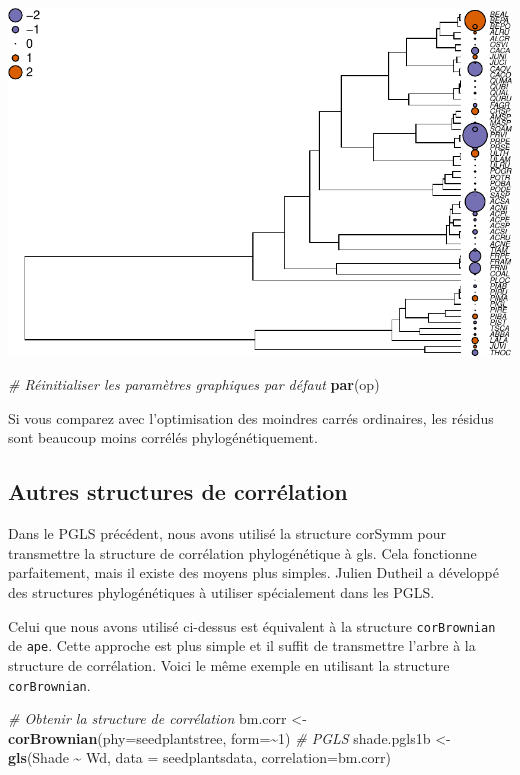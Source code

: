 \documentclass[
]{book}
\newenvironment{Shaded}{\begin{snugshade}}{\end{snugshade}}
\newcommand{\AttributeTok}[1]{\textcolor[rgb]{0.13,0.29,0.53}{#1}}
\newcommand{\CommentTok}[1]{\textcolor[rgb]{0.56,0.35,0.01}{\textit{#1}}}
\newcommand{\DecValTok}[1]{\textcolor[rgb]{0.00,0.00,0.81}{#1}}
\newcommand{\FunctionTok}[1]{\textcolor[rgb]{0.13,0.29,0.53}{\textbf{#1}}}
\newcommand{\NormalTok}[1]{#1}
\newcommand{\OtherTok}[1]{\textcolor[rgb]{0.56,0.35,0.01}{#1}}
\newcommand{\SpecialCharTok}[1]{\textcolor[rgb]{0.81,0.36,0.00}{\textbf{#1}}}
\begin{document}
\includegraphics{pcm-workshop_files/figure-latex/pgls residual fit-1.pdf}

\begin{Shaded}
\begin{Highlighting}[]
\CommentTok{\# Réinitialiser les paramètres graphiques par défaut}
\FunctionTok{par}\NormalTok{(op)}
\end{Highlighting}
\end{Shaded}

Si vous comparez avec l'optimisation des moindres carrés ordinaires, les résidus sont beaucoup moins corrélés phylogénétiquement.

\subsection{Autres structures de corrélation}\label{autres-structures-de-corruxe9lation}

Dans le PGLS précédent, nous avons utilisé la structure corSymm pour transmettre la structure de corrélation phylogénétique à gls. Cela fonctionne parfaitement, mais il existe des moyens plus simples. Julien Dutheil a développé des structures phylogénétiques à utiliser spécialement dans les PGLS.

Celui que nous avons utilisé ci-dessus est équivalent à la structure \texttt{corBrownian} de \texttt{ape}. Cette approche est plus simple et il suffit de transmettre l'arbre à la structure de corrélation. Voici le même exemple en utilisant la structure \texttt{corBrownian}.

\begin{Shaded}
\begin{Highlighting}[]
\CommentTok{\# Obtenir la structure de corrélation}
\NormalTok{bm.corr }\OtherTok{\textless{}{-}} \FunctionTok{corBrownian}\NormalTok{(}\AttributeTok{phy=}\NormalTok{seedplantstree, }\AttributeTok{form=}\SpecialCharTok{\textasciitilde{}}\DecValTok{1}\NormalTok{)}
\CommentTok{\# PGLS}
\NormalTok{shade.pgls1b }\OtherTok{\textless{}{-}} \FunctionTok{gls}\NormalTok{(Shade }\SpecialCharTok{\textasciitilde{}}\NormalTok{ Wd, }\AttributeTok{data =}\NormalTok{ seedplantsdata, }\AttributeTok{correlation=}\NormalTok{bm.corr)}
\end{Highlighting}
\end{Shaded}
\end{document}
